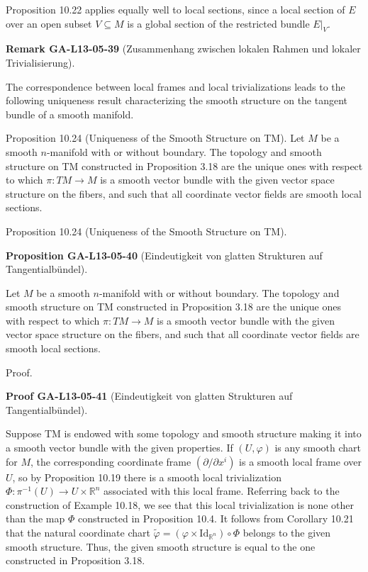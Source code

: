\documentclass[10pt, letterpaper]{article}
\newcommand{\CustomHeading}[3]{%
  \par\medskip\noindent%
  \textbf{#1 #2} \textnormal{(#3)}.\enskip%
}
\newenvironment{PROP}[2]{\begin{unitbox}\CustomHeading{Proposition}{#1}{#2}}{\end{unitbox}}
\newenvironment{REM}[2]{\begin{unitbox}\CustomHeading{Remark}{#1}{#2}}{\end{unitbox}}
\newenvironment{PROOF}[2]{\begin{unitbox}\CustomHeading{Proof}{#1}{#2}}{\end{unitbox}}
\begin{document}
Proposition 10.22 applies equally well to local sections, since a local section of $E$ over an open subset $V \subseteq M$ is a global section of the restricted bundle $\left.E\right|_{V}$.



\begin{REM}{GA-L13-05-39}{Zusammenhang zwischen lokalen Rahmen und lokaler Trivialisierung}
The correspondence between local frames and local trivializations leads to the following uniqueness result characterizing the smooth structure on the tangent bundle of a smooth manifold.

Proposition 10.24 (Uniqueness of the Smooth Structure on TM). Let $M$ be a smooth $n$-manifold with or without boundary. The topology and smooth structure on TM constructed in Proposition 3.18 are the unique ones with respect to which $\pi: T M \rightarrow M$ is a smooth vector bundle with the given vector space structure on the fibers, and such that all coordinate vector fields are smooth local sections.
\end{REM}


Proposition 10.24 (Uniqueness of the Smooth Structure on TM). 

\begin{PROP}{GA-L13-05-40}{Eindeutigkeit von glatten Strukturen auf Tangentialbündel}
Let $M$ be a smooth $n$-manifold with or without boundary. The topology and smooth structure on TM constructed in Proposition 3.18 are the unique ones with respect to which $\pi: T M \rightarrow M$ is a smooth vector bundle with the given vector space structure on the fibers, and such that all coordinate vector fields are smooth local sections.
\end{PROP}


Proof. 

\begin{PROOF}{GA-L13-05-41}{Eindeutigkeit von glatten Strukturen auf Tangentialbündel}
Suppose TM is endowed with some topology and smooth structure making it into a smooth vector bundle with the given properties. If $(U, \varphi)$ is any smooth chart for $M$, the corresponding coordinate frame $\left(\partial / \partial x^{i}\right)$ is a smooth local frame over $U$, so by Proposition 10.19 there is a smooth local trivialization $\Phi: \pi^{-1}(U) \rightarrow U \times \mathbb{R}^{n}$ associated with this local frame. Referring back to the construction of Example 10.18, we see that this local trivialization is none other than the map $\Phi$ constructed in Proposition 10.4. It follows from Corollary 10.21 that the natural coordinate chart $\widetilde{\varphi}=\left(\varphi \times \mathrm{Id}_{\mathbb{R}^{n}}\right) \circ \Phi$ belongs to the given smooth structure. Thus, the given smooth structure is equal to the one constructed in Proposition 3.18.
\end{PROOF}
\end{document}

